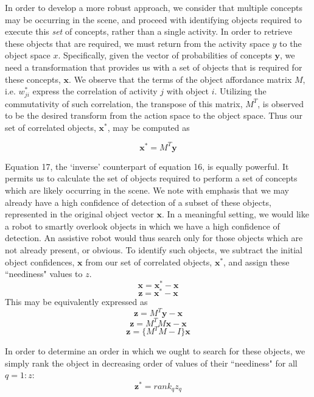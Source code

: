 In order to develop a more robust approach, we consider that multiple concepts may be occurring in the scene, and proceed with identifying objects required to execute this \textit{set} of concepts, rather than a single activity. In order to retrieve these objects that are required, we must return from the activity space $y$ to the object space $x$. Specifically, given the vector of probabilities of concepts $\mathbf{y}$, we need a transformation that provides us with a set of objects that is required for these concepts, $\mathbf{x}$. We observe that the terms of the object affordance matrix $M$, i.e. $w_{ji}^*$ express the correlation of activity $j$ with object $i$. Utilizing the commutativity of such correlation, the transpose of this matrix, $M^T$, is observed to be the desired transform from the action space to the object space. Thus our set of correlated objects, $\mathbf{x}^*$, may be computed as 

\begin{equation}
\mathbf{x}^*=M^T \mathbf{y}
\end{equation}

Equation 17, the `inverse' counterpart of equation 16, is equally powerful. It permits us to calculate the set of objects required to perform a set of concepts which are likely occurring in the scene. We note with emphasis that we may already have a high confidence of detection of a subset of these objects, represented in the original object vector $\mathbf{x}$. In a meaningful setting, we would like a robot to smartly overlook objects in which we have a high confidence of detection. An assistive robot would thus search only for those objects which are not already present, or obvious. To identify such objects, we subtract the initial object confidences, $\mathbf{x}$ from our set of correlated objects, $\mathbf{x}^*$, and assign these ``neediness" values to $z$. 
\begin{equation}
\mathbf{\mathbf{x}}=\mathbf{x}^* - \mathbf{x}
\end{equation}
\begin{equation}
\mathbf{z}=\mathbf{x}^* - \mathbf{x}
\end{equation}
This may be equivalently expressed as
\begin{equation}
\mathbf{z}=M^T \mathbf{y} - \mathbf{x}
\end{equation}
\begin{equation}
\mathbf{z}=M^TM\mathbf{x}-\mathbf{x}
\end{equation}
\begin{equation}
\mathbf{z}=\{M^TM - I\}\mathbf{x}
\end{equation}

In order to determine an order in which we ought to search for these objects, we simply rank the object in decreasing order of values of their ``neediness" for all $q = 1:z$:
\begin{equation}
\mathbf{z}^* = rank_q z_q
\end{equation}
 
 